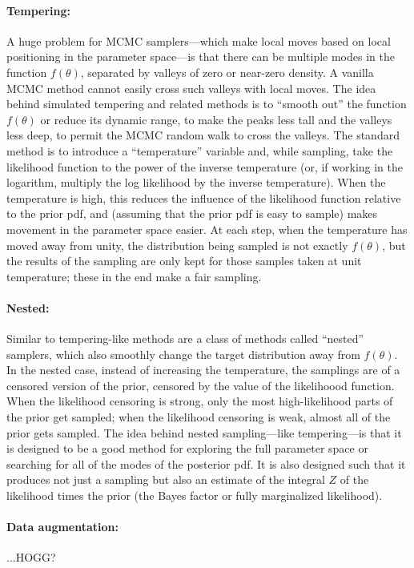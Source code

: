 \documentclass[12pt,twoside,pdftex]{article}
\newcommand{\pars}{\theta}
\begin{document}
\paragraph{Tempering:}
A huge problem for MCMC samplers---which make local moves based on
local positioning in the parameter space---is that there can be
multiple modes in the function $f(\pars)$, separated by valleys of
zero or near-zero density.
A vanilla MCMC method cannot easily cross such valleys with local
moves.
The idea behind simulated tempering and related methods is to ``smooth
out'' the function $f(\pars)$ or reduce its dynamic range, to make the
peaks less tall and the valleys less deep, to permit the MCMC random
walk to cross the valleys.
The standard method is to introduce a ``temperature'' variable and,
while sampling, take the likelihood function to the power of the
inverse temperature (or, if working in the logarithm, multiply the log
likelihood by the inverse temperature).
When the temperature is high, this reduces the influence of the
likelihood function relative to the prior pdf, and (assuming that the
prior pdf is easy to sample) makes movement in the parameter space
easier.
At each step, when the temperature has moved away from unity, the
distribution being sampled is not exactly $f(\pars)$, but the results
of the sampling are only kept for those samples taken at unit
temperature; these in the end make a fair sampling.

\paragraph{Nested:}
Similar to tempering-like methods are a class of methods called ``nested''
samplers, which also smoothly change the target distribution away from $f(\pars)$.
In the nested case, instead of increasing the temperature, the
samplings are of a censored version of the prior, censored by the
value of the likelihoood function.
When the likelihood censoring is strong, only the most high-likelihood
parts of the prior get sampled; when the likelihood censoring is weak,
almost all of the prior gets sampled.
The idea behind nested sampling---like tempering---is that it is
designed to be a good method for exploring the full parameter space or
searching for all of the modes of the posterior pdf.
It is also designed such that it produces not just a sampling but also
an estimate of the integral $Z$ of the likelihood times the prior
(the Bayes factor or fully marginalized likelihood).

\paragraph{Data augmentation:}
...HOGG?
\end{document}
